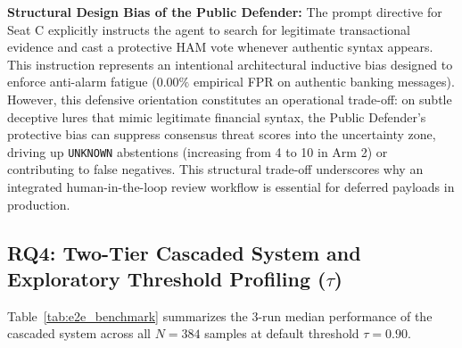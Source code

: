 \documentclass[journal]{IEEEtran}
\begin{document}
\textbf{Structural Design Bias of the Public Defender:} The prompt directive for Seat C explicitly instructs the agent to search for legitimate transactional evidence and cast a protective HAM vote whenever authentic syntax appears. This instruction represents an intentional architectural inductive bias designed to enforce anti-alarm fatigue ($0.00\%$ empirical FPR on authentic banking messages). However, this defensive orientation constitutes an operational trade-off: on subtle deceptive lures that mimic legitimate financial syntax, the Public Defender's protective bias can suppress consensus threat scores into the uncertainty zone, driving up \texttt{UNKNOWN} abstentions (increasing from 4 to 10 in Arm 2) or contributing to false negatives. This structural trade-off underscores why an integrated human-in-the-loop review workflow is essential for deferred payloads in production.

\subsection{RQ4: Two-Tier Cascaded System and Exploratory Threshold Profiling ($\tau$)}
\label{subsec:cascade}

Table~\ref{tab:e2e_benchmark} summarizes the 3-run median performance of the cascaded system across all $N = 384$ samples at default threshold $\tau = 0.90$.
\end{document}
